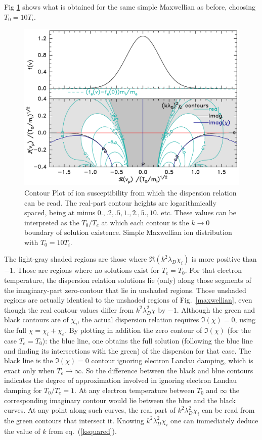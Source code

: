 \documentclass[12pt]{article}
\begin{document}
Fig \ref{maxwellion} shows what is obtained for the same
simple Maxwellian as before, choosing $T_0=10T_i$.
\begin{figure}[ht]
  \center\includegraphics[width=0.7\hsize]{maxwellion}\endcenter
  \caption{Contour Plot of ion susceptibility from which the
    dispersion relation can be read. The real-part contour heights are
    logarithmically spaced, being at minus $0.,.2,.5,1.,2.,5.,10.$
    etc. These values can be interpreted as the $T_0/T_e$ at which
    each contour is the $k\to 0$ boundary of solution existence.
    Simple Maxwellian ion distribution with
    $T_0=10T_i$.\label{maxwellion}}
\end{figure}
The light-gray shaded regions are those where
$\Re(k^2\lambda_D\chi_i)$ is more positive than $-1$. Those are
regions where no solutions exist for $T_e=T_0$. For that electron
temperature, the dispersion relation solutions lie (only) along those
segments of the imaginary-part zero-contour that lie in unshaded
regions. Those unshaded regions are actually identical to the unshaded
regions of Fig.\ \ref{maxwellian}, even though the real contour values
differ from $k^2\lambda_{D}^2 \chi$ by $-1$. Although the green and
black contours are of $\chi_i$, the actual dispersion relation
requires $\Im(\chi)=0$, using the full $\chi=\chi_i+\chi_e$. By
plotting in addition the zero contour of $\Im(\chi)$ (for the case
$T_e=T_0$): the blue line, one obtains the full solution (following
the blue line and finding its intersections with the green) of the
dispersion for that case. The black line is the $\Im(\chi)=0$ contour
ignoring electron Landau damping, which is exact only when
$T_e\to\infty$. So the difference between the black and blue contours
indicates the degree of approximation involved in ignoring electron
Landau damping for $T_0/T_e=1$. At any electron temperature between
$T_0$ and $\infty$ the corresponding imaginary contour would lie between
the blue and the black curves.  At any point along such curves, the
real part of $k^2\lambda_{D}^2 \chi_i$ can be read from the green
contours that intersect it. Knowing $k^2\lambda_{D}^2 \chi_i$ one can
immediately deduce the value of $k$ from eq.\ (\ref{ksquared}).
\end{document}
